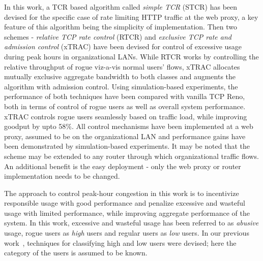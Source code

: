 \documentclass[conference]{../../IEEEtran}
\begin{document}
In this work, a TCR based algorithm called \emph{simple TCR} (STCR) has been devised for the specific case of rate limiting HTTP traffic at the web proxy, a key feature of this algorithm being the simplicity of implementation. Then two schemes - \emph{relative TCP rate control} (RTCR) and \emph{exclusive TCP rate and admission control} (xTRAC) have been devised for control of excessive usage during peak hours in organizational LANs. While RTCR works by controlling the relative throughput of rogue viz-a-vis normal users' flows, xTRAC allocates mutually exclusive aggregate bandwidth to both classes and augments the algorithm with admission control. Using simulation-based experiments, the performance of both techniques have been compared with vanilla TCP Reno, both in terms of control of rogue users as well as overall system performance. xTRAC controls rogue users seamlessly based on traffic load, while improving goodput by upto 58\%. All control mechanisms have been implemented at a web proxy, assumed to be on the organizational LAN and performance gains have been demonstrated by simulation-based experiments. It may be noted that the scheme may be extended to  any router through which organizational traffic flows. An additional benefit is the easy deployment - only the web proxy or router implementation needs to be changed. 

The approach to control peak-hour congestion in this work is to incentivize responsible usage with good performance and penalize excessive and wasteful usage with limited performance, while improving aggregate performance of the system. In this work, excessive and wasteful usage has been referred to as \emph{abusive} usage, rogue users as \emph{high} users and regular users as \emph{low} users. In our previous work~\cite{references:sait15}, techniques for classifying high and low users were devised; here the category of the users is assumed to be known.


\end{document}
